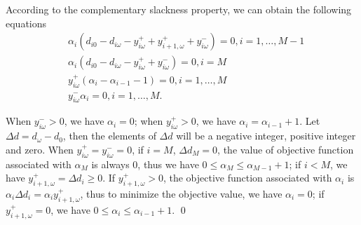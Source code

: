 \begin{pf}
  According to the complementary slackness property, we can obtain the following equations
  \begin{align*}
    & \alpha_{i} (d_{i0} - d_{i \omega} - y_{i \omega}^{+} + y_{i+1, \omega}^{+} + y_{i \omega}^{-}) = 0, i =1,\ldots, M-1 \\
    & \alpha_{i} (d_{i0} - d_{i \omega} - y_{i \omega}^{+}+ y_{i \omega}^{-}) = 0, i = M \\
    & y_{i \omega}^{+}(\alpha_{i} - \alpha_{i-1}-1) = 0, i =1,\ldots, M \\
    & y_{i \omega}^{-} \alpha_{i} = 0, i =1,\ldots, M.
  \end{align*}
  
  When $y_{i \omega}^{-} >0$, we have $\alpha_{i} =0$; when $y_{i \omega}^{+} >0$, we have $\alpha_{i} = \alpha_{i-1} +1$.
  Let $\Delta d = d_{\omega} - d_0$, then the elements of $\Delta d$ will be a negative integer, positive integer and zero.
  When $y_{i \omega}^{+} = y_{i \omega}^{-} = 0$, if $i = M$, $\Delta d_{M} =0$, the value of objective function associated with $\alpha_{M}$ is always $0$, thus we have $0 \leq \alpha_{M} \leq \alpha_{M-1}+1$; if $i < M$, we have $y_{i+1, \omega}^{+} = \Delta d_{i} \geq 0$. If $y_{i+1, \omega}^{+} > 0$, the objective function associated with $\alpha_i$ is $\alpha_{i} \Delta d_{i} = \alpha_{i} y_{i+1, \omega}^{+}$, thus to minimize the objective value, we have $\alpha_i =0$; if $y_{i+1, \omega}^{+} = 0$, we have $0 \leq \alpha_{i} \leq \alpha_{i-1} +1$.
  \qed
  \end{pf}

